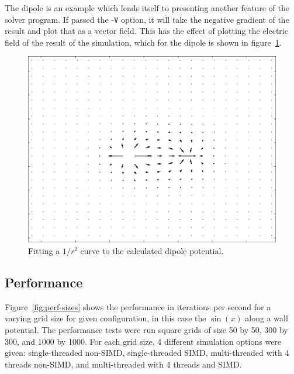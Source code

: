 The dipole is an example which lends itself to presenting another feature of the solver program. If passed the
$\texttt{-V}$ option, it will take the negative gradient of the result and plot that as a vector field. This has
the effect of plotting the electric field of the result of the simulation, which for the dipole is shown in
figure~\ref{fig:dipole-field}.

	\begin{figure}[h]
	\centering
	\includegraphics[width=0.7\linewidth]{dipole_field.pdf}
	\caption{Fitting a $1/r^2$ curve to the calculated dipole potential.} \label{fig:dipole-field}
	\end{figure}


\subsection{Performance}


Figure~\ref{fig:perf-sizes} shows the performance in iterations per second for a varying grid size for given
configuration, in this case the $\sin(x)$ along a wall potential. The performance tests were run square grids
of size 50 by 50, 300 by 300, and 1000 by 1000. For each grid size, 4 different simulation options were given:
single-threaded non-SIMD, single-threaded SIMD, multi-threaded with 4 threads non-SIMD, and multi-threaded
with 4 threads and SIMD.


